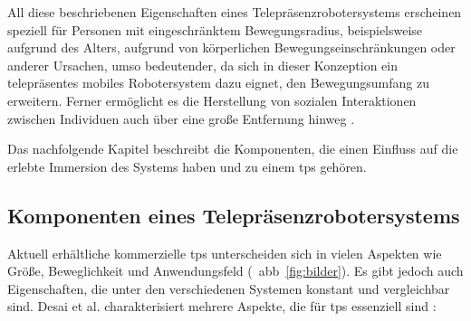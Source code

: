 All diese beschriebenen Eigenschaften eines Telepräsenzrobotersystems erscheinen speziell für Personen mit eingeschränktem Bewegungsradius, beispielsweise aufgrund des Alters, aufgrund von körperlichen Bewegungseinschränkungen oder anderer Ursachen, umso bedeutender, da sich in dieser Konzeption ein telepräsentes mobiles Robotersystem dazu eignet, den Bewegungsumfang zu erweitern. Ferner ermöglicht es die Herstellung von sozialen Interaktionen zwischen Individuen auch über eine große Entfernung hinweg \cite{Kristoffersson2013,sheridan1992,Tsui2014}. 

Das nachfolgende Kapitel beschreibt die Komponenten, die einen Einfluss auf die erlebte Immersion des Systems haben und zu einem \acs{tps} gehören.

\subsection{Komponenten eines Telepräsenzrobotersystems}
\label{subsection:komponenten}

Aktuell erhältliche kommerzielle \acs{tps} unterscheiden sich in vielen Aspekten wie Größe, Beweglichkeit und Anwendungsfeld (\vgl~\acs{abb}~\ref{fig:bilder}). Es gibt jedoch auch Eigenschaften, die unter den verschiedenen Systemen konstant und vergleichbar sind. Desai et al. charakterisiert mehrere Aspekte, die für \acs{tps} essenziell sind \cite{Desai2011}:

